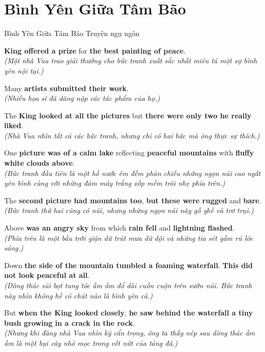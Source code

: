 \section{Bình Yên Giữa Tâm Bão}
\begin{truyen}{Bình Yên Giữa Tâm Bão}%
              {Truyện ngụ ngôn}

 \textbf{King offered a prize} for \textbf{the best painting of peace}.\\
\textit{(Một nhà Vua trao giải thưởng cho bức tranh xuất sắc nhất miêu tả một sự bình yên nội tại.)}

Many \textbf{artists submitted their work}.\\
\textit{(Nhiều họa sĩ đã dâng nộp các tác phẩm của họ.)}

The \textbf{King looked at all the pictures} but \textbf{there were only two he really liked}.\\
\textit{(Nhà Vua nhìn tất cả các bức tranh, nhưng chỉ có hai bức mà ông thực sự thích.)}

One \textbf{picture was of a calm lake} reflecting \textbf{peaceful mountains} with \textbf{fluffy white clouds above}.\\
\textit{(Bức tranh đầu tiên là một hồ nước êm đềm phản chiếu những ngọn núi cao ngất yên bình cùng với những đám mây trắng xốp mềm trôi nhẹ phía trên.)}

The \textbf{second picture had mountains too}, \textbf{but these were rugged} and \textbf{bare}.\\
\textit{(Bức tranh thứ hai cũng có núi, nhưng những ngọn núi này gồ ghề và trơ trụi.)}

Above \textbf{was an angry sky} from which \textbf{rain fell} and \textbf{lightning flashed}.\\
\textit{(Phía trên là một bầu trời giận dữ trút mưa dữ dội và những tia sét gầm rú lóe sáng.)}

Down \textbf{the side of the mountain tumbled a foaming waterfall}. \textbf{This did not look peaceful at all}.\\
\textit{(Dòng thác sủi bọt tung tóe ầm ầm đổ dài cuồn cuộn trên sườn núi. Bức tranh này nhìn không hề có chút nào là bình yên cả.)}

But \textbf{when the King looked closely}, \textbf{he saw behind the waterfall a tiny bush growing in a crack in the rock}.\\
\textit{(Nhưng khi đàng nhà Vua nhìn kỹ cẩn trọng, ông ta thấy nép sau dòng thác ầm ầm là một bụi cây nhỏ mọc trong vết nứt của tảng đá.)}


\end{truyen}
